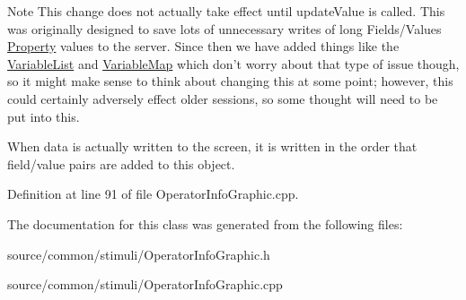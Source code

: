 \begin{DoxyNote}{Note}
This change does not actually take effect until update\-Value is called. This was originally designed to save lots of unnecessary writes of long Fields/\-Values \hyperlink{class_picto_1_1_property}{Property} values to the server. Since then we have added things like the \hyperlink{class_picto_1_1_variable_list}{Variable\-List} and \hyperlink{class_picto_1_1_variable_map}{Variable\-Map} which don't worry about that type of issue though, so it might make sense to think about changing this at some point; however, this could certainly adversely effect older sessions, so some thought will need to be put into this. 

When data is actually written to the screen, it is written in the order that field/value pairs are added to this object. 
\end{DoxyNote}


Definition at line 91 of file Operator\-Info\-Graphic.\-cpp.



The documentation for this class was generated from the following files\-:\begin{DoxyCompactItemize}
\item 
source/common/stimuli/Operator\-Info\-Graphic.\-h\item 
source/common/stimuli/Operator\-Info\-Graphic.\-cpp\end{DoxyCompactItemize}
